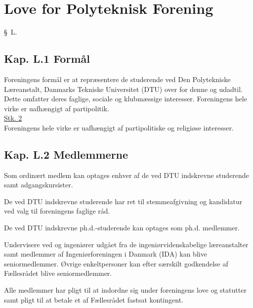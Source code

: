 \setcounter{section}{12}
\section*{Love for Polyteknisk Forening}
\begin{list}
{\S \ L.}{}
    \setlength{\labelwidth}{.5in}%
    \setlength{\leftmargin}{.25in} %




\subsection{Kap. L.1 Formål}\label{L:kap:Formaal}
\item Foreningens formål er at repræsentere de studerende ved Den Polytekniske Læreanstalt, Danmarks Tekniske Universitet (DTU) over for denne og udadtil. Dette omfatter deres faglige, sociale og klubmæssige interesser. Foreningens hele virke er uafhængigt af partipolitik.\\

\underline{Stk. 2} \\
Foreningens hele virke er uafhængigt af partipolitiske og religiøse interesser.

\subsection*{Kap. L.2 Medlemmerne}
\label{L:kap:medlemmerne}
\item Som ordinært medlem kan optages enhver af de ved DTU indskrevne studerende samt adgangskursister.
\item De ved DTU indskrevne studerende har ret til stemmeafgivning og kandidatur ved valg til foreningens faglige råd.
\item De ved DTU indskrevne ph.d.-studerende kan optages som ph.d. medlemmer.

\item Undervisere ved og ingeniører udgået fra de ingeniørvidenskabelige læreanstalter samt medlemmer af         Ingeniørforeningen i Danmark (IDA) kan blive seniormedlemmer. Øvrige enkeltpersoner kan efter særskilt godkendelse af Fællesrådet blive seniormedlemmer.
\item \label{L:Medlem:Pligt} Alle medlemmer har pligt til at indordne sig under foreningens love og statutter samt pligt til at betale et af Fællesrådet fastsat kontingent.\\


\end{list}
